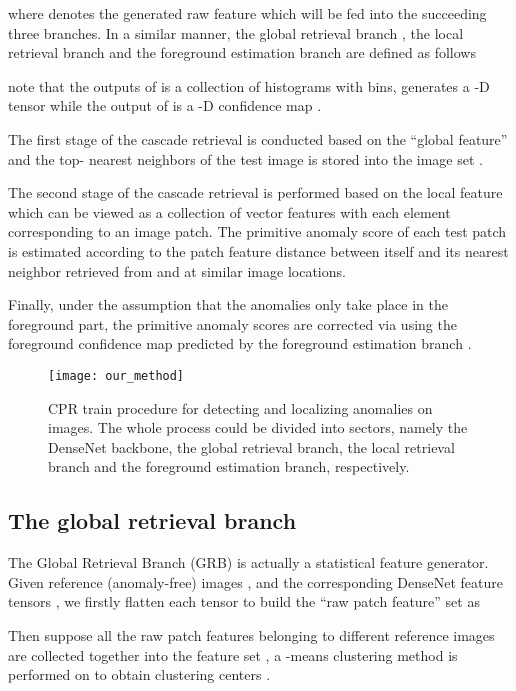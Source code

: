 \documentclass[lettersize,journal]{IEEEtran}
\begin{document}
where  denotes the generated raw feature which will be fed into the
succeeding three branches. In a similar manner, the global retrieval branch
, the local retrieval branch  and the foreground
estimation branch  are defined as follows

note that the outputs of  is a collection of  histograms with 
bins,  generates a -D tensor while the output of  is
a -D confidence map .

The first stage of the cascade retrieval is conducted based on the ``global feature''
 and the top- nearest neighbors of the test image  is
stored into the image set .


The second stage of the cascade retrieval is performed based on the local feature
 which can be viewed as a collection
of  vector features with each element corresponding to an image patch.
The primitive anomaly score of each test patch is estimated according to the patch feature distance between itself and its nearest neighbor retrieved from  and at similar image locations.

Finally, under the assumption that the anomalies only take place in the foreground part,
the primitive anomaly scores are corrected via using the foreground confidence map
 predicted by the foreground estimation branch
.

\begin{figure*}[htbp]
  \centering
  \texttt{[image: our\_method]}
  \caption{CPR train procedure for detecting and localizing anomalies on
    images. The whole process could be divided into  sectors, namely the DenseNet
    backbone, the global retrieval branch, the local retrieval branch and the foreground
    estimation branch, respectively.}\label{fig:our_method}
\end{figure*}

\subsection{The global retrieval branch}
\label{subsec:grb}
The Global Retrieval Branch (GRB) is actually a statistical feature generator. Given 
reference (anomaly-free) images , and the corresponding DenseNet feature tensors
, we
firstly flatten each tensor to build the ``raw patch feature'' set as

Then suppose all the raw patch features belonging to different reference images are
collected together into the feature set , a
-means clustering method is performed on  to obtain 
clustering centers .
\end{document}
